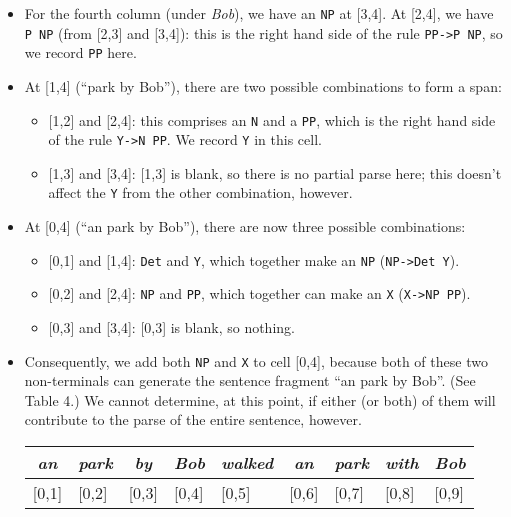 \documentclass[a4paper]{article}
\begin{document}
\begin{enumerate}
\begin{enumerate}
\begin{enumerate}
\begin{itemize}
\begin{table}[hp]
\begin{tabular}{ccccccccc}
\cline{9-9}
\end{tabular}
\caption{Cell [0,3] (spanning ``an park by'') has no partial parse, because there is no rule for \texttt{NP P}}
\end{table}
\item For the fourth column (under \textit{Bob}), we have an \texttt{NP} at [3,4]. At [2,4], we have \texttt{P NP} (from [2,3] and [3,4]): this is the right hand side of the rule \texttt{PP->P NP}, so we record \texttt{PP} here.
\item At [1,4] (``park by Bob''), there are two possible combinations to form a span:
\begin{itemize}
\item{} [1,2] and [2,4]: this comprises an \texttt{N} and a \texttt{PP}, which is the right hand side of the rule \texttt{Y->N PP}. We record \texttt{Y} in this cell.
\item{} [1,3] and [3,4]: [1,3] is blank, so there is no partial parse here; this doesn't affect the \texttt{Y} from the other combination, however.
\end{itemize}
\item At [0,4] (``an park by Bob''), there are now three possible combinations:
\begin{itemize}
\item{} [0,1] and [1,4]: \texttt{Det} and \texttt{Y}, which together make an \texttt{NP} (\texttt{NP->Det Y}).
\item{} [0,2] and [2,4]: \texttt{NP} and \texttt{PP}, which together can make an \texttt{X} (\texttt{X->NP PP}). 
\item{} [0,3] and [3,4]: [0,3] is blank, so nothing.
\end{itemize}
\item Consequently, we add both \texttt{NP} and \texttt{X} to cell [0,4], because both of these two non-terminals can generate the sentence fragment ``an park by Bob''. (See Table 4.) We cannot determine, at this point, if either (or both) of them will contribute to the parse of the entire sentence, however.
\begin{table}[hp]
\centering
\begin{tabular}{ccccccccc}
\textit{an} & \textit{park} & \textit{by} & \textit{Bob} & \textit{walked} & \textit{an} & \textit{park} & \textit{with} & \textit{Bob}\\
\hline
\multicolumn{1}{|l|}{[0,1]} & \multicolumn{1}{l|}{[0,2]} & \multicolumn{1}{l|}{[0,3]} & \multicolumn{1}{l|}{[0,4]} & \multicolumn{1}{l|}{[0,5]} & \multicolumn{1}{l|}{[0,6]} & \multicolumn{1}{l|}{[0,7]} & \multicolumn{1}{l|}{[0,8]} & \multicolumn{1}{l|}{[0,9]} \\

\end{tabular}
\end{table}
\end{itemize}
\end{enumerate}
\end{enumerate}
\end{enumerate}
\end{document}
